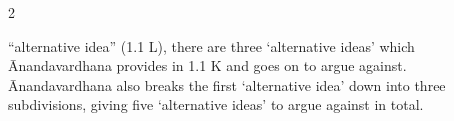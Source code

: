 \documentclass[10pt]{article}
\begin{document}
\begin{multicols}{2}
\begin{enumerate}[
			leftmargin=0em,
			rightmargin=0em,
		]


		 ``alternative idea'' (1.1 L),
		there are three `alternative ideas' which Ānandavardhana provides in 1.1 K and goes on to argue against.
		Ānandavardhana also breaks the first `alternative idea' down into three subdivisions, giving five `alternative ideas' to argue against in total.











\end{enumerate}
\end{multicols}
\end{document}
